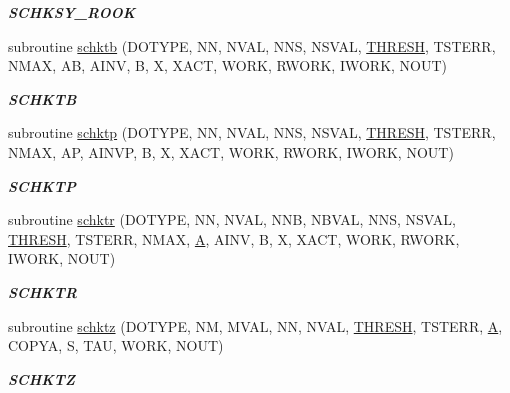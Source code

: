\begin{DoxyCompactItemize}
\begin{DoxyCompactList}\small\item\em {\bfseries S\+C\+H\+K\+S\+Y\+\_\+\+R\+O\+O\+K} \end{DoxyCompactList}\item 
subroutine \hyperlink{group__single__lin_ga687246b9c7a4484e5d7967d87c6224a8}{schktb} (D\+O\+T\+Y\+P\+E, N\+N, N\+V\+A\+L, N\+N\+S, N\+S\+V\+A\+L, \hyperlink{zlaqgs_8c_a0656018abfc9fa2821827415f5d5ea57}{T\+H\+R\+E\+S\+H}, T\+S\+T\+E\+R\+R, N\+M\+A\+X, A\+B, A\+I\+N\+V, B, X, X\+A\+C\+T, W\+O\+R\+K, R\+W\+O\+R\+K, I\+W\+O\+R\+K, N\+O\+U\+T)
\begin{DoxyCompactList}\small\item\em {\bfseries S\+C\+H\+K\+T\+B} \end{DoxyCompactList}\item 
subroutine \hyperlink{group__single__lin_ga0250484c525de8c53fe847d93845187b}{schktp} (D\+O\+T\+Y\+P\+E, N\+N, N\+V\+A\+L, N\+N\+S, N\+S\+V\+A\+L, \hyperlink{zlaqgs_8c_a0656018abfc9fa2821827415f5d5ea57}{T\+H\+R\+E\+S\+H}, T\+S\+T\+E\+R\+R, N\+M\+A\+X, A\+P, A\+I\+N\+V\+P, B, X, X\+A\+C\+T, W\+O\+R\+K, R\+W\+O\+R\+K, I\+W\+O\+R\+K, N\+O\+U\+T)
\begin{DoxyCompactList}\small\item\em {\bfseries S\+C\+H\+K\+T\+P} \end{DoxyCompactList}\item 
subroutine \hyperlink{group__single__lin_gaf043a9b41d537d6a31c27706c8f63a09}{schktr} (D\+O\+T\+Y\+P\+E, N\+N, N\+V\+A\+L, N\+N\+B, N\+B\+V\+A\+L, N\+N\+S, N\+S\+V\+A\+L, \hyperlink{zlaqgs_8c_a0656018abfc9fa2821827415f5d5ea57}{T\+H\+R\+E\+S\+H}, T\+S\+T\+E\+R\+R, N\+M\+A\+X, \hyperlink{classA}{A}, A\+I\+N\+V, B, X, X\+A\+C\+T, W\+O\+R\+K, R\+W\+O\+R\+K, I\+W\+O\+R\+K, N\+O\+U\+T)
\begin{DoxyCompactList}\small\item\em {\bfseries S\+C\+H\+K\+T\+R} \end{DoxyCompactList}\item 
subroutine \hyperlink{group__single__lin_ga02e0efc4bd1d0e8439f191ed75d7c5dd}{schktz} (D\+O\+T\+Y\+P\+E, N\+M, M\+V\+A\+L, N\+N, N\+V\+A\+L, \hyperlink{zlaqgs_8c_a0656018abfc9fa2821827415f5d5ea57}{T\+H\+R\+E\+S\+H}, T\+S\+T\+E\+R\+R, \hyperlink{classA}{A}, C\+O\+P\+Y\+A, S, T\+A\+U, W\+O\+R\+K, N\+O\+U\+T)
\begin{DoxyCompactList}\small\item\em {\bfseries S\+C\+H\+K\+T\+Z} \end{DoxyCompactList}\item 

\end{DoxyCompactItemize}
